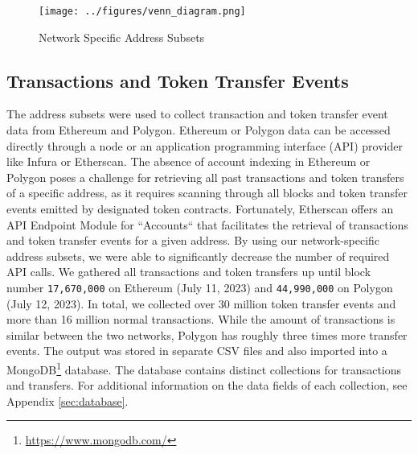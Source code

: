 \documentclass[12pt,a4paper,titlepage,oneside,english]{article}
\begin{document}
\begin{figure}[h!]
	\centering
	\texttt{[image: ../figures/venn\_diagram.png]}
	\caption{Network Specific Address Subsets}
	\label{fig:Venn}
\end{figure} 

\subsection{Transactions and Token Transfer Events}
The address subsets were used to collect transaction and token transfer event data from Ethereum and Polygon. Ethereum or Polygon data can be accessed directly through a node or an application programming interface (API) provider like Infura or Etherscan. The absence of account indexing in Ethereum or Polygon poses a challenge for retrieving all past transactions and token transfers of a specific address, as it requires scanning through all blocks and token transfer events emitted by designated token contracts. Fortunately, Etherscan offers an API Endpoint Module for ``Accounts`` that facilitates the retrieval of transactions and token transfer events for a given address. By using our network-specific address subsets, we were able to significantly decrease the number of required API calls. 
We gathered all transactions and token transfers up until block number \texttt{17,670,000} on Ethereum (July 11, 2023) and \texttt{44,990,000} on Polygon (July 12, 2023). In total, we collected over 30 million %
token transfer events and more than 16 million %
 normal transactions. While the amount of transactions is similar between the two networks, Polygon has roughly three times more transfer events. \newline The output was stored in separate CSV files and also imported into a MongoDB\footnote{\url{https://www.mongodb.com/}} database. The database contains distinct collections for transactions and transfers. For additional information on the data fields of each collection, see Appendix \ref{sec:database}. 

\iffalse
Figure X visualizes the number of daily transactions and token transfers for each chain.
\begin{figure}[h!]
	\centering
	\texttt{[image: ../figures/transfers\_tx\_by\_chain.png]}
	\caption{Monthly Transactions and Token Transfers by chain}
	\label{fig:Data}
\end{figure} 
\fi
\end{document}

